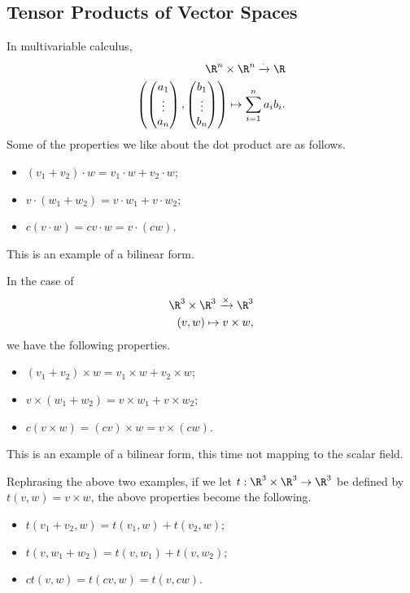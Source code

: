 \documentclass[10pt]{mypackage}
\begin{document}
  \subsection{Tensor Products of Vector Spaces}%
  \begin{example}
    In multivariable calculus,
    \begin{align*}
      \R^n\times\R^n \xrightarrow{\cdot}\R\\
      \left( \begin{pmatrix}a_1\\\vdots\\a_n\end{pmatrix}, \begin{pmatrix}b_1\\\vdots\\b_n\end{pmatrix}\right) \mapsto \sum_{i=1}^{n}a_ib_i.
    \end{align*}
    Some of the properties we like about the dot product are as follows.
    \begin{itemize}
      \item $\left(v_1 + v_2\right)\cdot w = v_1\cdot w + v_2\cdot w$;
      \item $v\cdot \left(w_1 + w_2\right) = v\cdot w_1 + v\cdot w_2$;
      \item $c\left(v\cdot w\right) = cv\cdot w = v\cdot \left(cw\right)$.
    \end{itemize}
    This is an example of a bilinear form.
  \end{example}
  \begin{example}
    In the case of
    \begin{align*}
      \R^3\times \R^3\xrightarrow{\times}\R^3\\
      \left(v,w\right) \mapsto v\times w,
    \end{align*}
    we have the following properties.
    \begin{itemize}
      \item $\left(v_1 + v_2\right)\times w = v_1\times w + v_2\times w$;
      \item $v\times \left(w_1 + w_2\right) = v\times w_1 + v\times w_2$;
      \item $c\left(v\times w\right) = \left(cv\right)\times w = v\times \left(cw\right)$.
    \end{itemize}
    This is an example of a bilinear form, this time not mapping to the scalar field.\newline

  Rephrasing the above two examples, if we let $t:\R^3\times\R^3 \rightarrow \R^3$ be defined by $t(v,w) = v\times w$, the above properties become the following.
  \begin{itemize}
    \item $t\left(v_1 + v_2,w\right) = t\left(v_1,w\right) + t\left(v_2,w\right)$;
    \item $t\left(v,w_1 + w_2\right) = t\left(v,w_1\right) + t\left(v,w_2\right)$;
    \item $ct\left(v,w\right) = t\left(cv,w\right) = t\left(v,cw\right)$.
  \end{itemize}
  \end{example}
\end{document}
